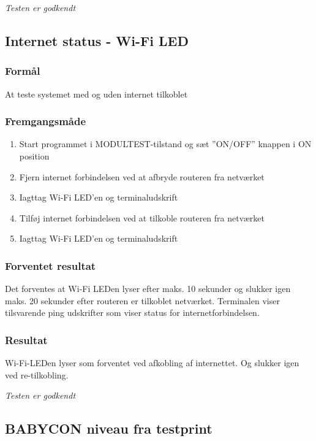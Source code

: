 
\textit{Testen er godkendt}

\subsection*{Internet status - Wi-Fi LED}

\subsubsection*{Formål}
At teste systemet med og uden internet tilkoblet

\subsubsection*{Fremgangsmåde}
\begin{enumerate}
\item Start programmet i MODULTEST-tilstand og sæt ''ON/OFF'' knappen i ON position
\item Fjern internet forbindelsen ved at afbryde routeren fra netværket
\item Iagttag Wi-Fi LED'en og terminaludskrift
\item Tilføj internet forbindelsen ved at tilkoble routeren fra netværket
\item Iagttag Wi-Fi LED'en og terminaludskrift
\end{enumerate}

\subsubsection*{Forventet resultat} 
Det forventes at Wi-Fi LEDen lyser efter maks. 10 sekunder og slukker igen maks. 20 sekunder efter routeren er tilkoblet netværket. Terminalen viser tilsvarende ping udskrifter som viser status for internetforbindelsen.

\subsubsection*{Resultat} 
Wi-Fi-LEDen lyser som forventet ved afkobling af internettet. Og slukker igen ved re-tilkobling.

\textit{Testen er godkendt}

\subsection*{BABYCON niveau fra testprint}

